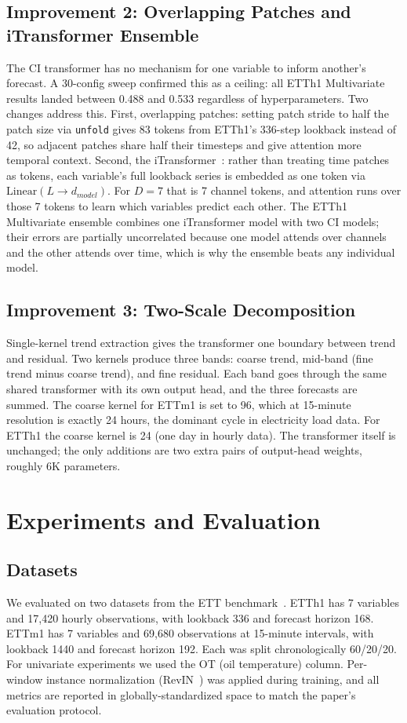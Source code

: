 \documentclass[conference]{IEEEtran}
\begin{document}
\subsection{Improvement 2: Overlapping Patches and iTransformer Ensemble}
The CI transformer has no mechanism for one variable to inform another's forecast. A 30-config sweep confirmed this as a ceiling: all ETTh1 Multivariate results landed between 0.488 and 0.533 regardless of hyperparameters. Two changes address this. First, overlapping patches: setting patch stride to half the patch size via \texttt{unfold} gives 83 tokens from ETTh1's 336-step lookback instead of 42, so adjacent patches share half their timesteps and give attention more temporal context. Second, the iTransformer~\cite{itransformer}: rather than treating time patches as tokens, each variable's full lookback series is embedded as one token via $\mathrm{Linear}(L \rightarrow d_{model})$. For $D{=}7$ that is 7 channel tokens, and attention runs over those 7 tokens to learn which variables predict each other. The ETTh1 Multivariate ensemble combines one iTransformer model with two CI models; their errors are partially uncorrelated because one model attends over channels and the other attends over time, which is why the ensemble beats any individual model.

\subsection{Improvement 3: Two-Scale Decomposition}
Single-kernel trend extraction gives the transformer one boundary between trend and residual. Two kernels produce three bands: coarse trend, mid-band (fine trend minus coarse trend), and fine residual. Each band goes through the same shared transformer with its own output head, and the three forecasts are summed. The coarse kernel for ETTm1 is set to 96, which at 15-minute resolution is exactly 24 hours, the dominant cycle in electricity load data. For ETTh1 the coarse kernel is 24 (one day in hourly data). The transformer itself is unchanged; the only additions are two extra pairs of output-head weights, roughly 6K parameters.

\section{Experiments and Evaluation}

\subsection{Datasets}
We evaluated on two datasets from the ETT benchmark~\cite{informer}. ETTh1 has 7 variables and 17{,}420 hourly observations, with lookback 336 and forecast horizon 168. ETTm1 has 7 variables and 69{,}680 observations at 15-minute intervals, with lookback 1440 and forecast horizon 192. Each was split chronologically 60/20/20. For univariate experiments we used the OT (oil temperature) column. Per-window instance normalization (RevIN~\cite{revin}) was applied during training, and all metrics are reported in globally-standardized space to match the paper's evaluation protocol.
\end{document}
